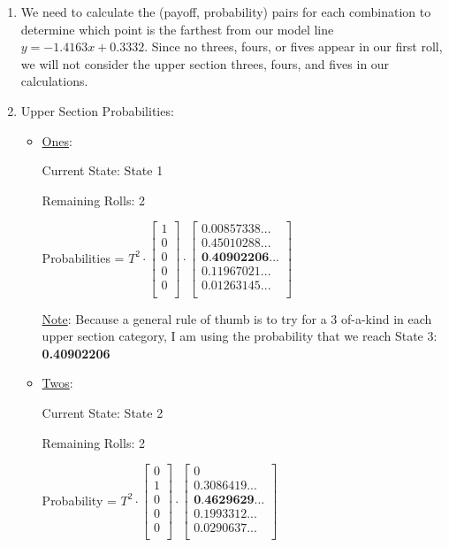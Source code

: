 \documentclass[12pt,a4paper]{article}
\begin{document}
\begin{enumerate}
    \item We need to calculate the (payoff, probability) pairs for each combination to determine which point is the farthest from our model line $y = -1.4163x + 0.3332$. Since no threes, fours, or fives appear in our first roll, we will not consider the upper section threes, fours, and fives in our calculations.
    \item Upper Section Probabilities:
    \begin{itemize}
        \item \underline{Ones}:

        Current State: State 1

        Remaining Rolls: 2

        Probabilities = $T^2 \cdot \begin{bmatrix}
1 \\
0 \\
0 \\
0 \\
0 \\
\end{bmatrix} \cdot \begin{bmatrix}
0.00857338... \\
0.45010288... \\
\textbf{0.40902206...} \\
0.11967021... \\
0.01263145... \\
\end{bmatrix}$

\underline{Note}: Because a general rule of thumb is to try for a 3 of-a-kind in each upper section category, I am using the probability that we reach State 3: \textbf{0.40902206}

        \item \underline{Twos}:

        Current State: State 2

        Remaining Rolls: 2

        Probability = $T^2 \cdot \begin{bmatrix}
0 \\
1 \\
0 \\
0 \\
0 \\
\end{bmatrix} \cdot \begin{bmatrix}
0 \\
0.3086419... \\
\textbf{0.4629629...} \\
0.1993312... \\
0.0290637... \\
\end{bmatrix}$


\end{itemize}
\end{enumerate}
\end{document}
